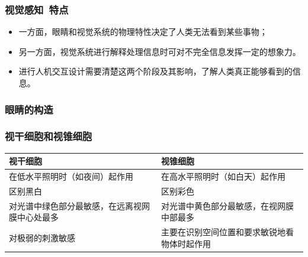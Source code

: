\documentclass{beamer}
\begin{document}
\begin{frame}
	\frametitle{视觉感知~{\small 特点}}
	\beamertemplatetransparentcovereddynamicmedium 
	\begin{itemize}[<+->]
		\item 一方面，眼睛和视觉系统的物理特性决定了人类无法看到某些事物；
		\item 另一方面，视觉系统进行解释处理信息时可对不完全信息发挥一定的想象力。
		\item 进行人机交互设计需要清楚这两个阶段及其影响，了解人类真正能够看到的信息。
	\end{itemize}	
\end{frame}

\begin{frame}
	\frametitle{眼睛的构造}
	\transboxout
\end{frame}

\begin{frame}
	\frametitle{视干细胞和视锥细胞}
	\begin{tabular}[t]{p{4.5cm}p{4.5cm}}
		\hline
		视干细胞 & 视锥细胞\\
		\hline
		在低水平照明时（如夜间）起作用 & 在高水平照明时（如白天）起作用\\
		区别黑白 & 区别彩色\\
		对光谱中绿色部分最敏感，在远离视网膜中心处最多 & 对光谱中黄色部分最敏感，在视网膜中部最多\\
		对极弱的刺激敏感 & 主要在识别空间位置和要求敏锐地看物体时起作用\\
		\hline
	\end{tabular}
\end{frame}
\end{document}
